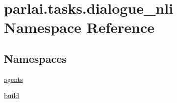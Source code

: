 \hypertarget{namespaceparlai_1_1tasks_1_1dialogue__nli}{}\section{parlai.\+tasks.\+dialogue\+\_\+nli Namespace Reference}
\label{namespaceparlai_1_1tasks_1_1dialogue__nli}
\subsection*{Namespaces}
\begin{DoxyCompactItemize}
\item 
 \hyperlink{namespaceparlai_1_1tasks_1_1dialogue__nli_1_1agents}{agents}
\item 
 \hyperlink{namespaceparlai_1_1tasks_1_1dialogue__nli_1_1build}{build}
\end{DoxyCompactItemize}
